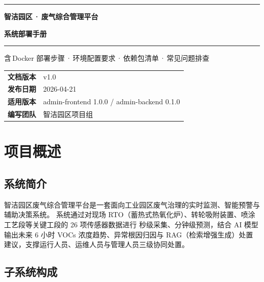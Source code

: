 \documentclass[UTF8,a4paper,11pt]{ctexart}
\begin{document}
\begin{titlepage}
\centering
\vspace*{2.5cm}
{\color{accentblue}\rule{14cm}{1.2pt}}\par
\vspace{0.4cm}
{\Huge\bfseries 智洁园区\,·\,废气综合管理平台\par}
\vspace{0.6cm}
{\LARGE\bfseries\color{accentblue} 系统部署手册\par}
\vspace{0.3cm}
{\color{accentblue}\rule{14cm}{1.2pt}}\par
\vspace{1.8cm}
{\large 含\,Docker 部署步骤\,·\,环境配置要求\,·\,依赖包清单\,·\,常见问题排查\par}
\vfill
\begin{tabular}{rl}
  \textbf{文档版本} & v1.0 \\
  \textbf{发布日期} & 2026-04-21 \\
  \textbf{适用版本} & admin-frontend 1.0.0 / admin-backend 0.1.0 \\
  \textbf{编写团队} & 智洁园区项目组 \\
\end{tabular}
\vspace{2cm}
\end{titlepage}

\tableofcontents
\newpage

\section{项目概述}

\subsection{系统简介}
智洁园区废气综合管理平台是一套面向工业园区废气治理的实时监测、智能预警与辅助决策系统。
系统通过对现场 RTO（蓄热式热氧化炉）、转轮吸附装置、喷涂工艺段等关键工段的 26 项传感器数据进行
秒级采集、分钟级预测，结合 AI 模型输出未来 6 小时 VOCs 浓度趋势、异常根因归因与
RAG（检索增强生成）处置建议，支撑运行人员、运维人员与管理人员三级协同处置。

\subsection{子系统构成}
\end{document}
